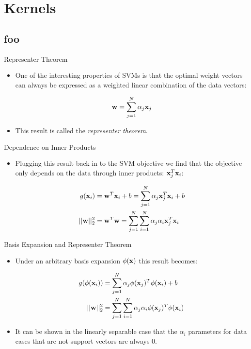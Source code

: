 \documentclass[serif,xcolor=pdftex,dvipsnames,table,hyperref={bookmarks=false}]{beamer}
\begin{document}
\section{Kernels}
\subsection{foo}

\begin{frame}[t]{Representer Theorem}

\begin{itemize}
\setlength{\itemsep}{8pt}
\item One of the interesting properties of SVMs is that the optimal weight vectors can always be expressed as a weighted linear combination of the data vectors:

$${\mathbf{w}} = \sum_{j=1}^N \alpha_j {\mathbf{x}}_j$$

\pause\item This result is called the \textit{representer theorem}. 

\end{itemize}
\end{frame}

\begin{frame}[t]{Dependence on Inner Products}

\begin{itemize}
\setlength{\itemsep}{8pt}
\item Plugging this result back in to the SVM objective we find that the objective only depends on the data through inner products: ${\mathbf{x}}_j^T{\mathbf{x}}_i$:

\begin{align*}
g({\mathbf{x}}_i) &= {\mathbf{w}}^T{\mathbf{x}}_i + b 
= \sum_{j=1}^N \alpha_j {\mathbf{x}}_j^T{\mathbf{x}}_i +b\\
||{\mathbf{w}}||_2^2 &= {\mathbf{w}}^T{\mathbf{w}} 
= \sum_{j=1}^N \sum_{i=1}^N \alpha_j\alpha_i {\mathbf{x}}_j^T{\mathbf{x}}_i
\end{align*}


\end{itemize}
\end{frame}

\begin{frame}[t]{Basis Expansion and Representer Theorem}

\begin{itemize}
\setlength{\itemsep}{8pt}
\item Under an arbitrary basis expansion $\phi({\mathbf{x}})$ this result becomes:

\begin{align*}
g(\phi({\mathbf{x}}_i)) &= \sum_{j=1}^N \alpha_j \phi({\mathbf{x}}_j)^T\phi({\mathbf{x}}_i) +b\\
||{\mathbf{w}}||_2^2  &= \sum_{j=1}^N \sum_{i=1}^N \alpha_j\alpha_i \phi({\mathbf{x}}_j)^T\phi({\mathbf{x}}_i) \\
\end{align*}

\item It can be shown in the linearly separable case that the $\alpha_i$ parameters
for data cases that are not support vectors are always $0$.

\end{itemize}
\end{frame}
\end{document}
